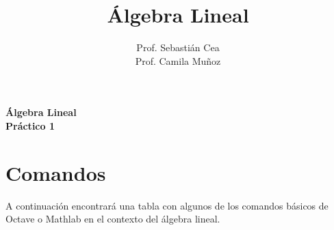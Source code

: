 \documentclass[12pt]{article}
\title{\'Algebra Lineal}
\author{Prof. Sebasti\'an Cea \\Prof. Camila Muñoz\\
}
\date{}
\theoremstyle{exampstyle}
\theoremstyle{definition}
\theoremstyle{break}
\numberwithin{equation}{section}
\begin{document}

\begin{minipage}[r]{15cm}


\end{minipage}

\begin{center}
\Large{\textbf{\'Algebra Lineal\\Pr\'actico 1  }}
\end{center}
\section{Comandos}
A continuación encontrará una tabla con algunos de los comandos básicos de Octave o Mathlab en el contexto del álgebra lineal.
\end{document}
